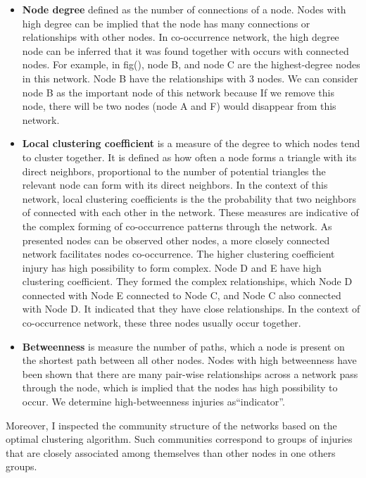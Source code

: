 \begin{itemize}

\item \textbf{Node degree} defined as the number of connections of a node. Nodes with high degree can be implied that the node has many connections or relationships with other nodes. In co-occurrence network, the high degree node can be inferred that it was found together with occurs with connected nodes. For example, in fig(), node B, and node C are the highest-degree nodes in this network. Node B have the relationships with 3 nodes. We can consider node B as the important node of this network because If we remove this node, there will be two nodes (node A and F) would disappear from this network.

\item \textbf{Local clustering coefficient} is a measure of the degree to which nodes tend to cluster together. It is defined as how often a node forms a triangle with its direct neighbors, proportional to the number of potential triangles the relevant node can form with its direct neighbors. In the context of this network, local clustering coefficients is the the probability that two neighbors of connected with each other in the network. These measures are indicative of the complex forming of co-occurrence patterns through the network. As presented nodes can be observed other nodes, a more closely connected network facilitates nodes co-occurrence. The higher clustering coefficient injury has high possibility to form complex. Node D and E have high clustering coefficient. They formed the complex relationships, which Node D connected with Node E connected to Node C, and Node C also connected with Node D. It indicated that they have close relationships. In the context of co-occurrence network, these three nodes usually occur together.

\item \textbf{Betweenness} is measure the number of paths, which a node is present on the shortest path between all other nodes. Nodes with high betweenness have been shown that there are many pair-wise relationships across a network pass through the node, which is implied that the nodes has high possibility to occur. We determine high-betweenness injuries as``indicator''. 

\end{itemize}

Moreover, I inspected the community structure of the networks based on the optimal clustering algorithm. Such communities correspond to groups of injuries that are closely associated among themselves than other nodes in one others groups.

